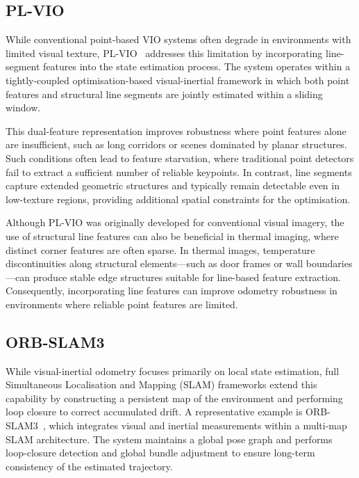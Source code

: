 \subsection{PL-VIO}

While conventional point-based VIO systems often degrade in environments with limited visual texture, PL-VIO~\cite{He_2018} addresses this limitation by incorporating line-segment features into the state estimation process. The system operates within a tightly-coupled optimisation-based visual-inertial framework in which both point features and structural line segments are jointly estimated within a sliding window.

This dual-feature representation improves robustness where point features alone are insufficient, such as long corridors or scenes dominated by planar structures. Such conditions often lead to feature starvation, where traditional point detectors fail to extract a sufficient number of reliable keypoints. In contrast, line segments capture extended geometric structures and typically remain detectable even in low-texture regions, providing additional spatial constraints for the optimisation.

Although PL-VIO was originally developed for conventional visual imagery, the use of structural line features can also be beneficial in thermal imaging, where distinct corner features are often sparse. In thermal images, temperature discontinuities along structural elements—such as door frames or wall boundaries—can produce stable edge structures suitable for line-based feature extraction. Consequently, incorporating line features can improve odometry robustness in environments where reliable point features are limited.

\subsection{ORB-SLAM3}

While visual-inertial odometry focuses primarily on local state estimation, full Simultaneous Localisation and Mapping (SLAM) frameworks extend this capability by constructing a persistent map of the environment and performing loop closure to correct accumulated drift. A representative example is ORB-SLAM3~\cite{Campos_2021}, which integrates visual and inertial measurements within a multi-map SLAM architecture. The system maintains a global pose graph and performs loop-closure detection and global bundle adjustment to ensure long-term consistency of the estimated trajectory.

